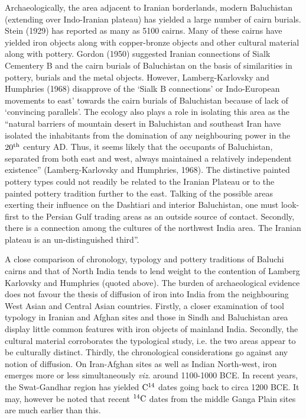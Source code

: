 Archaeologically, the area adjacent to Iranian borderlands, modern Baluchistan (extending over Indo-Iranian plateau) has yielded a large number of cairn burials. Stein (1929) has reported as many as 5100 cairns. Many of these cairns have yielded iron objects along with copper-bronze objects and other cultural material along with pottery. Gordon (1950) suggested Iranian connections of Sialk Cementery B and the cairn burials of Baluchistan on the basis of similarities in pottery, burials and the metal objects. However, Lamberg-Karlovsky and Humphries (1968) disapprove of the ‘Sialk B connections’ or Indo-European movements to east’ towards the cairn burials of Baluchistan because of lack of ‘convincing parallels’. The ecology also plays a role in isolating this area as the “natural barriers of mountain desert in Baluchistan and southeast Iran have isolated the inhabitants from the domination of any neighbouring power in the $20^{\rm th}$ century AD. Thus, it seems likely that the occupants of Baluchistan, separated from both east and west, always maintained a relatively independent existence” (Lamberg-Karlovsky and Humphries, 1968). The distinctive painted pottery types could not readily be related to the Iranian Plateau or to the painted pottery tradition further to the east. Talking of the possible areas exerting their influence on the Dashtiari and interior Baluchistan, one must look-first to the Persian Gulf trading areas as an outside source of contact. Secondly, there is a connection among the cultures of the northwest India area. The Iranian plateau is an un-distinguished third”.

A close comparison of chronology, typology and pottery traditions of Baluchi cairns and that of North India tends to lend weight to the contention of Lamberg Karlovsky and Humphries (quoted above). The burden of archaeological evidence does not favour the thesis of diffusion of iron into India from the neighbouring West Asian and Central Asian countries. Firstly, a closer examination of tool typology in Iranian and Afghan sites and those in Sindh and Baluchistan area display little common features with iron objects of mainland India. Secondly, the cultural material corroborates the typological study, i.e. the two areas appear to be culturally distinct. Thirdly, the chronological considerations go against any notion of diffusion. On Iran-Afghan sites as well as Indian North-west, iron emerges more or less simultaneously \textit{viz}. around 1100-1000 BCE. In recent years, the Swat-Gandhar region has yielded ${\rm C}^{\rm 14}$ dates going back to circa 1200 BCE. It may, however be noted that recent $^{14}{\rm C}$ dates from the middle Ganga Plain sites are much earlier than this.


